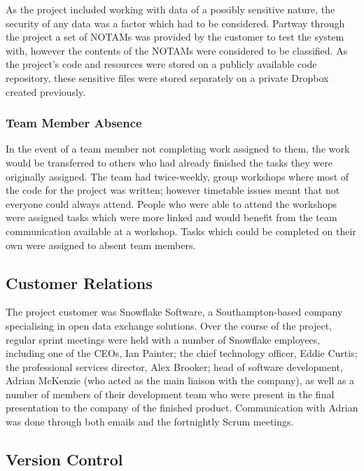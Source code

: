 \documentclass[a4paper, 12pt, twoside]{article}
\begin{document}
As the project included working with data of a possibly sensitive nature, the security of any data was a factor which had to be considered. Partway through the project a set of NOTAMs was provided by the customer to test the system with, however the contents of the NOTAMs were considered to be classified. As the project's code and resources were stored on a publicly available code repository, these sensitive files were stored separately on a private Dropbox created previously.

\subsubsection{Team Member Absence}

In the event of a team member not completing work assigned to them, the work would be transferred to others who had already finished the tasks they were originally assigned. The team had twice-weekly, group workshops where most of the code for the project was written; however timetable issues meant that not everyone could always attend. People who were able to attend the workshops were assigned tasks which were more linked and would benefit from the team communication available at a workshop. Tasks which could be completed on their own were assigned to absent team members.

\subsection{Customer Relations}
\label{sec:plan_customer_relations}

The project customer was Snowflake Software, a Southampton-based company specialising in open data exchange solutions. Over the course of the project, regular sprint meetings were held with a number of Snowflake employees, including one of the CEOs, Ian Painter; the chief technology officer, Eddie Curtis; the professional services director, Alex Brooker; head of software development, Adrian McKenzie (who acted as the main liaison with the company), as well as a number of members of their development team who were present in the final presentation to the company of the finished product. Communication with Adrian was done through both emails and the fortnightly Scrum meetings.

\subsection{Version Control}
\label{sec:version_control}
\end{document}
